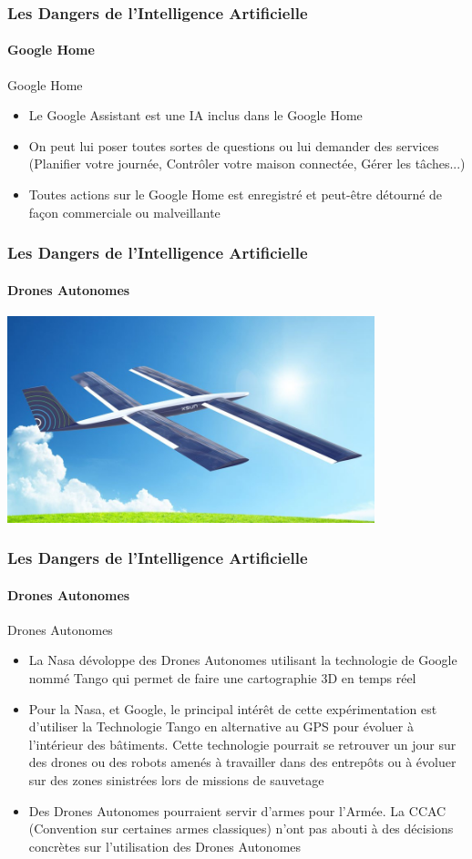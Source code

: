 \documentclass{beamer}
\begin{document}
	\begin{frame}[fragile]
	\frametitle{Les Dangers de l'Intelligence Artificielle}
	\framesubtitle{Google Home}
	\begin{block}{Google Home}
	\begin{itemize}
	\itemsep1em
		\item Le Google Assistant est une IA inclus dans le Google Home
		\item On peut lui poser toutes sortes de questions ou lui demander des services (Planifier votre journée, Contrôler votre maison connectée, Gérer les tâches...)
		\item Toutes actions sur le Google Home est enregistré et peut-être détourné de façon commerciale ou malveillante
	\end{itemize}
	\end{block}
	\end{frame}
	
	\begin{frame}[fragile]
	\frametitle{Les Dangers de l'Intelligence Artificielle}
	\framesubtitle{Drones Autonomes}
	\centerline{\includegraphics[height=6cm]{drone.jpg}}
	\end{frame}
	
	\begin{frame}[fragile]
	\frametitle{Les Dangers de l'Intelligence Artificielle}
	\framesubtitle{Drones Autonomes}
	\begin{block}{Drones Autonomes}
	\begin{itemize}
	\itemsep1em
		\item La Nasa dévoloppe des Drones Autonomes utilisant la technologie de Google nommé Tango qui permet de faire une cartographie 3D en temps réel
		\item Pour la Nasa, et Google, le principal intérêt de cette expérimentation est d'utiliser la Technologie Tango en alternative au GPS pour évoluer à l'intérieur des bâtiments. Cette technologie pourrait se retrouver un jour sur des drones ou des robots amenés à travailler dans des entrepôts ou à évoluer sur des zones sinistrées lors de missions de sauvetage
		\item Des Drones Autonomes pourraient servir d'armes pour l'Armée. La CCAC (Convention sur certaines armes classiques) n'ont pas abouti à des décisions concrètes sur l'utilisation des Drones Autonomes
	\end{itemize}
	\end{block}
	\end{frame}
	
\end{document}
